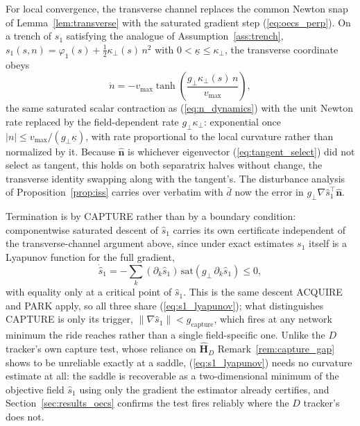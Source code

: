 \documentclass[lettersize,journal]{IEEEtran}
\begin{document}
For local convergence, the transverse channel replaces the common
Newton snap of Lemma~\ref{lem:transverse} with the saturated gradient
step (\ref{eq:oecs_perp}). On a trench of $s_1$ satisfying the analogue
of Assumption~\ref{ass:trench}, $s_1(s, n) = \varphi_1(s) +
\tfrac{1}{2}\kappa_\perp(s)\,n^2$ with $0 < \underline{\kappa} \leq
\kappa_\perp$, the transverse coordinate obeys
\begin{equation}
    \dot{n} = -v_{\max}\tanh\!\left(
    \frac{g_\perp \kappa_\perp(s)\,n}{v_{\max}}\right),
    \label{eq:oecs_n_dynamics}
\end{equation}
the same saturated scalar contraction as (\ref{eq:n_dynamics}) with the
unit Newton rate replaced by the field-dependent rate $g_\perp
\kappa_\perp$: exponential once $|n| \leq v_{\max}/(g_\perp
\underline{\kappa})$, with rate proportional to the local curvature
rather than normalized by it. Because $\hat{\mathbf{n}}$ is whichever
eigenvector (\ref{eq:tangent_select}) did not select as tangent, this
holds on both separatrix halves without change, the transverse identity
swapping along with the tangent's. The disturbance analysis of
Proposition~\ref{prop:iss} carries over verbatim with $\bar{d}$ now the
error in $g_\perp \nabla\hat{s}_1^\top\hat{\mathbf{n}}$.

Termination is by CAPTURE rather than by a boundary condition:
componentwise saturated descent of $\hat{s}_1$ carries its own
certificate independent of the transverse-channel argument above,
since under exact estimates $s_1$ itself is a Lyapunov function for the
full gradient,
\begin{equation}
    \dot{\hat{s}}_1 = -\sum_k (\partial_k \hat{s}_1)\,
    \mathrm{sat}(g_\perp\,\partial_k \hat{s}_1) \leq 0,
    \label{eq:s1_lyapunov}
\end{equation}
with equality only at a critical point of $\hat{s}_1$. This is the same
descent ACQUIRE and PARK apply, so all three share
(\ref{eq:s1_lyapunov}); what distinguishes CAPTURE is only its trigger,
$\lVert\nabla\hat{s}_1\rVert < g_{\text{capture}}$, which fires at any
network minimum the ride reaches rather than a single field-specific
one. Unlike the $D$ tracker's own capture test, whose reliance on
$\hat{\mathbf{H}}_D$ Remark~\ref{rem:capture_gap} shows to be unreliable
exactly at a saddle, (\ref{eq:s1_lyapunov}) needs no curvature estimate
at all: the saddle is recoverable as a two-dimensional minimum of the
objective field $\hat{s}_1$ using only the gradient the estimator
already certifies, and Section~\ref{sec:results_oecs} confirms the test
fires reliably where the $D$ tracker's does not.
\end{document}
